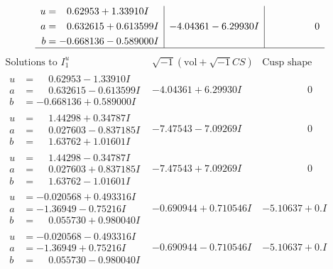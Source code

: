 \documentclass[1p]{elsarticle_modified}
\theoremstyle{definition}
\newcommand{\I}{\sqrt{-1}}
\begin{document}
$$\begin{array}{c|c|c}
\begin{aligned}
u &= \phantom{-}0.62953 + 1.33910 I \\
a &= \phantom{-}0.632615 + 0.613599 I \\
b &= -0.668136 - 0.589000 I\end{aligned}
 & -4.04361 - 6.29930 I & \phantom{-0.000000 } 0\\
 \hline 
 \end{array}$$\newpage$$\begin{array}{c|c|c}  
\text{Solutions to }I^u_{1}& \I (\text{vol} + \sqrt{-1}CS) & \text{Cusp shape}\\
 \hline 
\begin{aligned}
u &= \phantom{-}0.62953 - 1.33910 I \\
a &= \phantom{-}0.632615 - 0.613599 I \\
b &= -0.668136 + 0.589000 I\end{aligned}
 & -4.04361 + 6.29930 I & \phantom{-0.000000 } 0 \\ \hline\begin{aligned}
u &= \phantom{-}1.44298 + 0.34787 I \\
a &= \phantom{-}0.027603 - 0.837185 I \\
b &= \phantom{-}1.63762 + 1.01601 I\end{aligned}
 & -7.47543 - 7.09269 I & \phantom{-0.000000 } 0 \\ \hline\begin{aligned}
u &= \phantom{-}1.44298 - 0.34787 I \\
a &= \phantom{-}0.027603 + 0.837185 I \\
b &= \phantom{-}1.63762 - 1.01601 I\end{aligned}
 & -7.47543 + 7.09269 I & \phantom{-0.000000 } 0 \\ \hline\begin{aligned}
u &= -0.020568 + 0.493316 I \\
a &= -1.36949 - 0.75216 I \\
b &= \phantom{-}0.055730 + 0.980040 I\end{aligned}
 & -0.690944 + 0.710546 I & -5.10637 + 0. I\phantom{ +0.000000I} \\ \hline\begin{aligned}
u &= -0.020568 - 0.493316 I \\
a &= -1.36949 + 0.75216 I \\
b &= \phantom{-}0.055730 - 0.980040 I\end{aligned}
 & -0.690944 - 0.710546 I & -5.10637 + 0. I\phantom{ +0.000000I} \\ \hline\begin{aligned}

\end{aligned}
\end{array}$$
\end{document}
